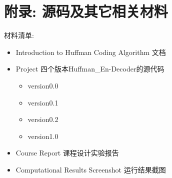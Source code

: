 \documentclass[a4paper]{ctexart}
\begin{document}

\section{附录: 源码及其它相关材料}\label{header-n478}

材料清单:

\begin{itemize}
\item
  Introduction to Huffman Coding Algorithm 文档
\item
  Project 四个版本Huffman\_En-Decoder的源代码

  \begin{itemize}
  \item
    version0.0
  \item
    version0.1
  \item
    version0.2
  \item
    version1.0
  \end{itemize}
\item
  Course Report 课程设计实验报告
\item
  Computational Results Screenshot 运行结果截图
\end{itemize}


\end{document}
